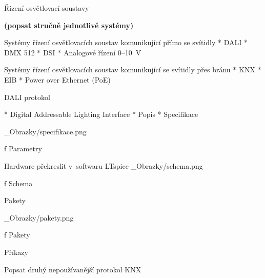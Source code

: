 \chap Řízení osvětlovací soustavy

{\bf (popsat stručně jednotlivé systémy)}

\medskip
Systémy řízení osvětlovacích soustav komunikující přímo se svítidly
\medskip
\begitems
    * DALI
    * DMX 512
    * DSI
    * Analogové řízení 0--10~V
\enditems

\medskip
Systémy řízení osvětlovacích soustav komunikující se svítidly přes bránu
\begitems
    * KNX
    * EIB
    * Power over Ethernet (PoE)
\enditems

\sec DALI protokol


\begitems
    * Digital Addressable Lighting Interface
\medskip
    * Popis
\medskip
    * Specifikace
\enditems

\medskip {}
\picw=12cm _Obrazky/specifikace.png
\caption/f Parametry
\medskip

\secc Hardware překreslit v~softwaru LTspice
\medskip {}
\picw=15cm _Obrazky/schema.png
\caption/f Schema
\medskip

\secc Pakety

\medskip {}
\picw=15cm _Obrazky/pakety.png
\caption/f Pakety
\medskip

\secc Příkazy

\secc Popsat druhý nepoužívanější protokol KNX